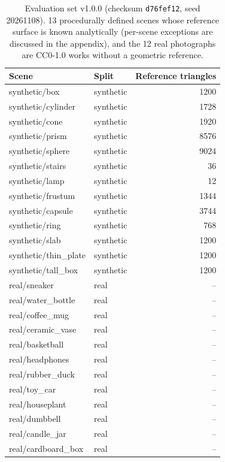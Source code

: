 \begin{table}[t]
\centering
\caption{Evaluation set v1.0.0 (checksum \texttt{d76fef12}, seed 20261108). 13 procedurally defined scenes whose reference surface is known analytically (per-scene exceptions are discussed in the appendix), and the 12 real photographs are CC0-1.0 works without a geometric reference.}
\label{tab:dataset}
\small
\begin{tabular}{llr}
\toprule
Scene & Split & Reference triangles \\
\midrule
synthetic/box & synthetic & 1200 \\
synthetic/cylinder & synthetic & 1728 \\
synthetic/cone & synthetic & 1920 \\
synthetic/prism & synthetic & 8576 \\
synthetic/sphere & synthetic & 9024 \\
synthetic/stairs & synthetic & 36 \\
synthetic/lamp & synthetic & 12 \\
synthetic/frustum & synthetic & 1344 \\
synthetic/capsule & synthetic & 3744 \\
synthetic/ring & synthetic & 768 \\
synthetic/slab & synthetic & 1200 \\
synthetic/thin\_plate & synthetic & 1200 \\
synthetic/tall\_box & synthetic & 1200 \\
real/sneaker & real & -- \\
real/water\_bottle & real & -- \\
real/coffee\_mug & real & -- \\
real/ceramic\_vase & real & -- \\
real/basketball & real & -- \\
real/headphones & real & -- \\
real/rubber\_duck & real & -- \\
real/toy\_car & real & -- \\
real/houseplant & real & -- \\
real/dumbbell & real & -- \\
real/candle\_jar & real & -- \\
real/cardboard\_box & real & -- \\
\bottomrule
\end{tabular}
\end{table}
